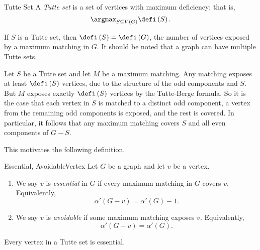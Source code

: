 \documentclass[co342]{subfiles}
\begin{document}
    \begin{definition}{Tutte Set}{}
        A \emph{Tutte set} is a set of vertices with maximum deficiency; that is,
        \begin{equation*}
            \argmax_{S\subseteq V\left( G \right)} \defi\left( S \right).
        \end{equation*}
    \end{definition}
    
    If $S$ is a Tutte set, then $\defi\left( S \right)=\defi\left( G \right)$, the number of vertices exposed by a maximum matching in $G$. It should be noted that a graph can have multiple Tutte sets.

    Let $S$ be a Tutte set and let $M$ be a maximum matching. Any matching exposes at least $\defi\left( S \right)$ vertices, due to the structure of the odd components and $S$. But $M$ exposes exactly $\defi\left( S \right)$ vertices by the Tutte-Berge formula. So it is the case that each vertex in $S$ is matched to a distinct odd component, a vertex from the remaining odd components is exposed, and the rest is covered. In particular, it follows that any maximum matching covers $S$ and all even components of $G-S$.

    This motivates the following definition.

    \begin{definition}{Essential, Avoidable}{Vertex}
        Let $G$ be a graph and let $v$ be a vertex.
        \begin{enumerate}
            \item We say $v$ is \emph{essential} in $G$ if every maximum matching in $G$ covers $v$. Equivalently,
                \begin{equation*}
                    \alpha'\left( G-v \right) = \alpha'\left( G \right)-1.
                \end{equation*}

            \item We say $v$ is \emph{avoidable} if some maximum matching exposes $v$. Equivalently,
                \begin{equation*}
                    \alpha'\left( G-v \right)=\alpha'\left( G \right).
                \end{equation*}
        \end{enumerate}
    \end{definition}

    \clearpage
    \begin{lemma_inside}{}
        Every vertex in a Tutte set is essential.
    \end{lemma_inside}
\end{document}
